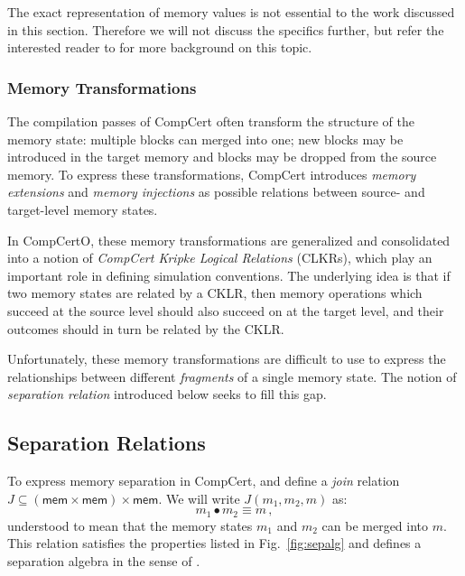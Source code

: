 \documentclass[acmsmall,screen,review,anonymous]{acmart}
\newcommand{\kw}[1]{\ensuremath{ \mathsf{#1} }}
\begin{document}
The exact representation of memory values
is not essential to the work discussed in this section.
Therefore
we will not discuss the specifics further,
but refer the interested reader to \citet{compcertmmv2}
for more background on this topic.

\subsubsection{Memory Transformations}

The compilation passes of CompCert
often transform the structure of the memory state:
multiple blocks can merged into one;
new blocks may be introduced in the target memory
and blocks may be dropped from the source memory.
To express these transformations,
CompCert introduces \emph{memory extensions} and \emph{memory injections}
as possible relations between source- and target-level memory states.

In CompCertO,
these memory transformations are generalized and consolidated
into a notion of \emph{CompCert Kripke Logical Relations} (CLKRs),
which play an important role in defining simulation conventions.
The underlying idea is that
if two memory states are related by a CKLR,
then memory operations which succeed at the source level
should also succeed on at the target level,
and their outcomes should in turn be related
by the CKLR.

Unfortunately,
these memory transformations are difficult to use
to express the relationships between
different \emph{fragments} of a single memory state.
The notion of \emph{separation relation} introduced below
seeks to fill this gap.

\subsection{Separation Relations} %

To express memory separation in CompCert,
and define a \emph{join} relation
$J \subseteq (\kw{mem} \times \kw{mem}) \times \kw{mem}$.
We will write $J(m_1, m_2, m)$ as:
\[
  m_1 \bullet m_2 \equiv m
  \,,
\]
understood to mean that
the memory states $m_1$ and $m_2$
can be merged into $m$.
This relation satisfies the properties listed in Fig.~\ref{fig:sepalg}
and defines a separation algebra in the sense of \citet{freshlook}.
\end{document}
